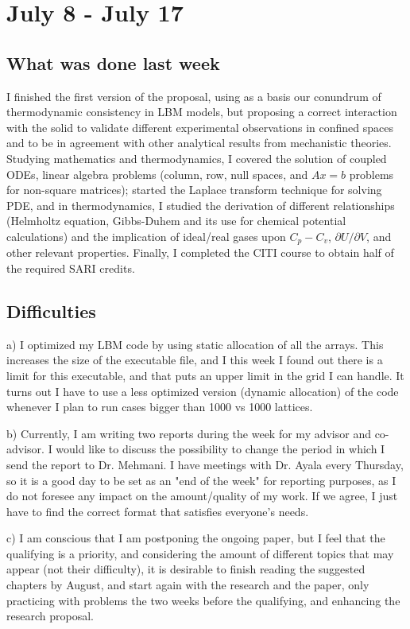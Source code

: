 \documentclass[12pt]{article}
\begin{document}
	\pagebreak
	\section*{July 8 - July 17}
	\subsection*{What was done last week}
	I finished the first version of the proposal, using as a basis our conundrum of thermodynamic consistency in LBM models, but proposing a correct interaction with the solid to validate different experimental observations in confined spaces and to be in agreement with other analytical results from mechanistic theories. Studying mathematics and thermodynamics, I covered the solution of coupled ODEs, linear algebra problems (column, row, null spaces, and $Ax =b$ problems for non-square matrices); started the Laplace transform technique for solving PDE, and in thermodynamics, I studied the derivation of different relationships (Helmholtz equation, Gibbs-Duhem and its use for chemical potential calculations) and the implication of ideal/real gases upon $C_p - C_v$, $\partial U/ \partial V$, and other relevant properties.
	Finally, I completed the CITI course to obtain half of the required SARI credits. 
	
	\subsection*{Difficulties}
	a) I optimized my LBM code by using static allocation of all the arrays. This increases the size of the executable file, and I this week I found out there is a limit for this executable, and that puts an upper limit in the grid I can handle. It turns out I have to use a less optimized version (dynamic allocation) of the code whenever I plan to run cases bigger than 1000 vs 1000 lattices.
	
	b) Currently, I am writing two reports during the week for my advisor and co-advisor. I would like to discuss the possibility to change the period in which I send the report to Dr. Mehmani. I have meetings with Dr. Ayala every Thursday, so it is a good day to be set as an "end of the week" for reporting purposes, as I do not foresee any impact on the amount/quality of my work. If we agree, I just have to find the correct format that satisfies everyone's needs.
	 
	c)	I am conscious that I am postponing the ongoing paper, but I feel that the qualifying is a priority, and considering the amount of different topics that may appear (not their difficulty), it is desirable to finish reading the suggested chapters by August, and start again with the research and the paper, only practicing with problems the two weeks before the qualifying, and enhancing the research proposal. 
\end{document}
